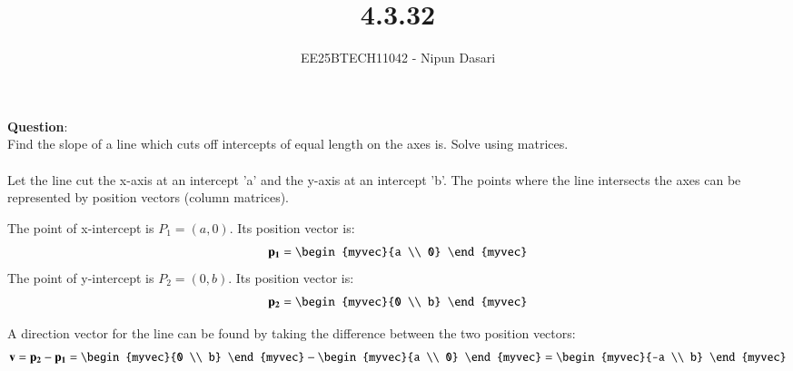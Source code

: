 \documentclass[journal]{IEEEtran}
\begin{document}
	
	
	\vspace{3cm}
	
	\title{4.3.32}
	\author{EE25BTECH11042 - Nipun Dasari}
	\maketitle
	
	\renewcommand{\thefigure}{\theenumi}
	\renewcommand{\thetable}{\theenumi}
	\setlength{\intextsep}{10pt} %
	
	
	\renewcommand{\thetable}{\theenumi}
	
	\textbf{Question}:\\
	Find the slope of a line which cuts off intercepts of equal length on the axes is. Solve using matrices. \\ 
	\solution \\
	
	Let the line cut the x-axis at an intercept 'a' and the y-axis at an intercept 'b'. The points where the line intersects the axes can be represented by position vectors (column matrices).
	
	The point of x-intercept is $P_1 = (a, 0)$. Its position vector is:
	\begin{align}
		\vec{p_1} = \begin{myvec}{a \\ 0} \end{myvec}
	\end{align}
	The point of y-intercept is $P_2 = (0, b)$. Its position vector is:
	\begin{align}
		\vec{p_2} = \begin{myvec}{0 \\ b} \end{myvec}
	\end{align}
	
	A direction vector for the line can be found by taking the difference between the two position vectors:
	\begin{align}
		\vec{v} = \vec{p_2} - \vec{p_1} = \begin{myvec}{0 \\ b} \end{myvec} - \begin{myvec}{a \\ 0} \end{myvec} = \begin{myvec}{-a \\ b} \end{myvec} \label{eq:0.3}
	\end{align}
	
\end{document}
